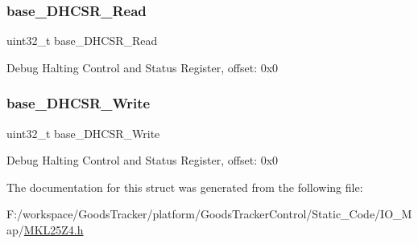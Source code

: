 \subsubsection{\texorpdfstring{base\+\_\+\+D\+H\+C\+S\+R\+\_\+\+Read}{base\_DHCSR\_Read}}
{\footnotesize\ttfamily uint32\+\_\+t base\+\_\+\+D\+H\+C\+S\+R\+\_\+\+Read}

Debug Halting Control and Status Register, offset\+: 0x0 \mbox{\label{struct_core_debug___mem_map_a033962700f14389a6ecb3282097e4308}} 
\subsubsection{\texorpdfstring{base\+\_\+\+D\+H\+C\+S\+R\+\_\+\+Write}{base\_DHCSR\_Write}}
{\footnotesize\ttfamily uint32\+\_\+t base\+\_\+\+D\+H\+C\+S\+R\+\_\+\+Write}

Debug Halting Control and Status Register, offset\+: 0x0 

The documentation for this struct was generated from the following file\+:\begin{DoxyCompactItemize}
\item 
F\+:/workspace/\+Goods\+Tracker/platform/\+Goods\+Tracker\+Control/\+Static\+\_\+\+Code/\+I\+O\+\_\+\+Map/\hyperlink{_m_k_l25_z4_8h}{M\+K\+L25\+Z4.\+h}\end{DoxyCompactItemize}
